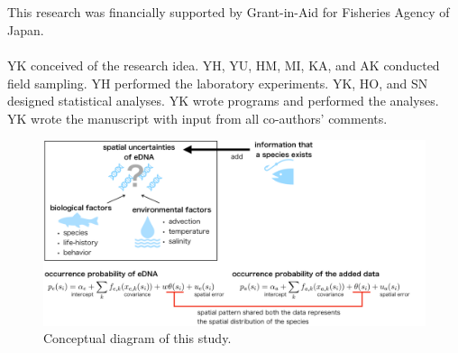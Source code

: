 \documentclass[12pt]{article}
\begin{document}
\begin{linenumbers}
\ \\
\\
This research was financially supported by Grant-in-Aid for Fisheries Agency of Japan.
\ \\

\\
YK conceived of the research idea. YH, YU, HM, MI, KA, and AK conducted field sampling. YH performed the laboratory experiments. YK, HO, and SN designed statistical analyses. YK wrote programs and performed the analyses. YK wrote the manuscript with input from all co-authors' comments.
\ \\

\newpage
\begin{figure}[h]
  \centering
  \includegraphics[width = 18cm]{fig1.png}
  \caption{Conceptual diagram of this study.}
\end{figure}



\end{linenumbers}
\end{document}
